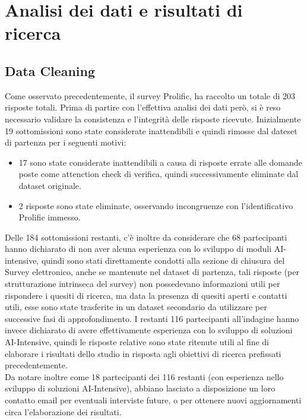 \chapter{Analisi dei dati e  risultati di ricerca} %
%

     \section{Data Cleaning}
    
    Come osservato precedentemente, il survey Prolific, ha raccolto un totale di 203 risposte totali. Prima di partire con l'effettiva analisi dei dati però, si è reso necessario validare la consistenza e l'integrità delle risposte ricevute. Inizialmente 19 sottomissioni sono state considerate inattendibili e quindi rimosse dal dateset di partenza per i seguenti motivi:
    
    \begin{itemize}
        \item 17 sono state considerate inattendibili a causa di risposte errate alle domande poste come attenction check di verifica, quindi successivamente eliminate dal dataset originale.
        \item 2 risposte sono state eliminate, osservando incongruenze con l'identificativo Prolific immesso.
    \end{itemize}
     
    Delle 184 sottomissioni restanti, c'è inoltre da considerare che 68 partecipanti hanno dichiarato di non aver alcuna esperienza con lo sviluppo di moduli AI-intensive, quindi sono stati direttamente condotti alla sezione di chiusura del Survey elettronico, anche se mantenute nel dataset di partenza, tali risposte (per strutturazione intrinseca del survey) non possedevano informazioni utili per rispondere i quesiti di ricerca, ma data la presenza di quesiti aperti e contatti utili, esse sono state trasferite in un dataset secondario da utilizzare per successive fasi di approfondimento. I restanti 116 partecipanti all'indagine hanno invece dichiarato di avere effettivamente esperienza con lo sviluppo di soluzioni AI-Intensive, quindi le risposte relative sono state ritenute utili al fine di elaborare i risultati dello studio in risposta agli obiettivi di ricerca prefissati precedentemente.\\  
    
    
    Da notare inoltre come 18 partecipanti dei 116 restanti (con esperienza nello sviluppo di soluzioni AI-Intensive), abbiano lasciato a disposizione un loro contatto email per eventuali interviste future, o per ottenere nuovi aggiornamenti circa l'elaborazione dei risultati.  
    
